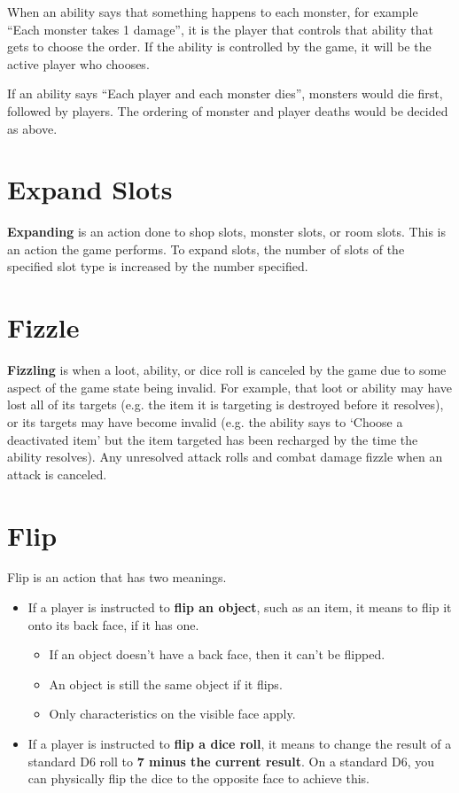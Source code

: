 \documentclass[
  fontsize=10pt,
  paper=a5,
  version=last,
  chapterprefix=true,
  bindingoffset=5mm,
  ]{scrbook}
\begin{document}
    When an ability says that something happens to each monster, for example “Each monster takes 1 damage”, it is the player that controls that ability that gets to choose the order. If the ability is controlled by the game, it will be the active player who chooses.

    If an ability says “Each player and each monster dies”, monsters would die first, followed by players. The ordering of monster and player deaths would be decided as above.
    \section{Expand Slots}
    \textbf{Expanding} is an action done to shop slots, monster slots, or room slots. This is an action the game performs. To expand slots, the number of slots of the specified slot type is increased by the number specified.
    \section{Fizzle}
    \textbf{Fizzling} is when a loot, ability, or dice roll is canceled by the game due to some aspect of the game state being invalid. For example, that loot or ability may have lost all of its targets (e.g. the item it is targeting is destroyed before it resolves), or its targets may have become invalid (e.g. the ability says to ‘Choose a deactivated item’ but the item targeted has been recharged by the time the ability resolves). Any unresolved attack rolls and combat damage fizzle when an attack is canceled.
    \section{Flip}
    Flip is an action that has two meanings.

    \begin{itemize}
        \item If a player is instructed to \textbf{flip an object}, such as an item, it means to flip it onto its back face, if it has one.
        \begin{itemize}
            \item If an object doesn’t have a back face, then it can’t be flipped.
            \item An object is still the same object if it flips.
            \item Only characteristics on the visible face apply.
        \end{itemize}
        \item If a player is instructed to \textbf{flip a dice roll}, it means to change the result of a standard D6 roll to \textbf{7 minus the current result}. On a standard D6, you can physically flip the dice to the opposite face to achieve this.
    \end{itemize}
\end{document}
